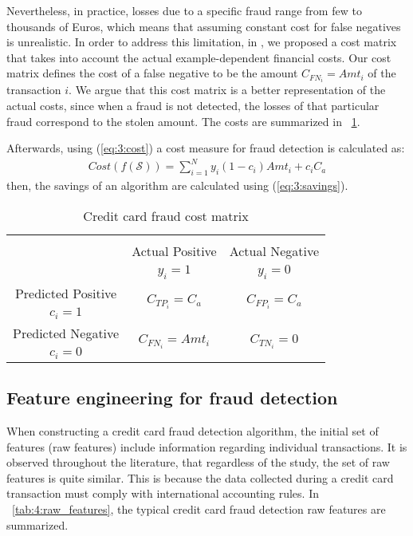   Nevertheless, in  practice, losses due to a specific fraud  range from few to 
  thousands of Euros, which means that  assuming constant cost for false  negatives is  
  unrealistic. In order to address this limitation, in  \citep{CorreaBahnsen2013}, we   proposed a 
  cost matrix that takes into account the actual  example-dependent financial costs. Our  cost 
  matrix defines the cost of a false negative to be the   amount $C_{FN_i}=Amt_i$ of the  
  transaction $i$. We argue that this cost matrix is a better representation of the   actual costs, 
  since when a  fraud is not detected, the losses of that particular fraud correspond   to the 
  stolen amount. The costs are summarized in \tablename{~\ref{tab:4:table_costmat_fraud}}.

	Afterwards, using (\ref{eq:3:cost}) a cost measure for fraud detection is calculated as:
  \begin{align} \label{eq:4:cost}
    Cost(f(\mathcal{S})) = \sum_{i=1}^{N} y_i(1-c_i)Amt_i + c_iC_a
  \end{align}
  then, the savings of an algorithm are calculated using (\ref{eq:3:savings}).

	\begin{table}[t]
		\centering
		\footnotesize
		\begin{tabular}{c | c | c }
		\multicolumn{3}{c}{}\\
			\multicolumn{1}{c|}{}  & Actual Positive& Actual Negative \\
			\multicolumn{1}{c|}{} & $y_i=1$& $y_i=0$ \\
			\hline
			Predicted Positive 		& \multirow{ 2}{*}{$C_{TP_i}=C_a$} & \multirow{ 2}{*}{$C_{FP_i}=C_a$} 
			\\
			$c_i=1$ & &\\
			\hline
			Predicted Negative  	& \multirow{ 2}{*}{$C_{FN_i}=Amt_i$} & \multirow{ 
			2}{*}{$C_{TN_i}=0$} \\
			$c_i=0$ & &\\
		\end{tabular}
		\caption{Credit card fraud cost matrix \citep{CorreaBahnsen2013}}
		\label{tab:4:table_costmat_fraud}
	\end{table}
	 
\subsection{Feature engineering for fraud detection}
\label{sec:4:frad:features}

  When constructing a credit card fraud detection algorithm, the initial set of features (raw 
  features) include information regarding individual transactions. It is observed throughout the 
  literature, that regardless of the study, the set of raw features is quite similar. This is 
  because the data collected during a credit card transaction must comply with international 
  accounting rules. In \tablename{~\ref{tab:4:raw_features}}, the typical credit card fraud 
  detection  raw features are summarized.
	
